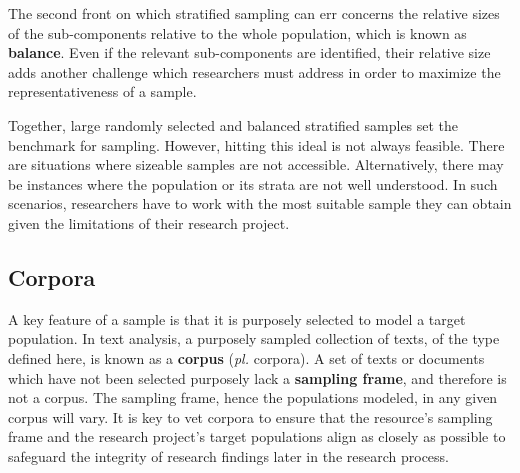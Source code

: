 \documentclass[
  letterpaper,
  DIV=11,
  numbers=noendperiod]{scrreport}
\theoremstyle{definition}
\theoremstyle{remark}
\begin{document}
The second front on which stratified sampling can err concerns the
relative sizes of the sub-components relative to the whole population,
which is known as \textbf{balance}. Even if the relevant sub-components
are identified, their relative size adds another challenge which
researchers must address in order to maximize the representativeness of
a sample.

Together, large randomly selected and balanced stratified samples set
the benchmark for sampling. However, hitting this ideal is not always
feasible. There are situations where sizeable samples are not
accessible. Alternatively, there may be instances where the population
or its strata are not well understood. In such scenarios, researchers
have to work with the most suitable sample they can obtain given the
limitations of their research project.

\hypertarget{corpora}{%
\subsection{Corpora}\label{corpora}}

A key feature of a sample is that it is purposely selected to model a
target population. In text analysis, a purposely sampled collection of
texts, of the type defined here, is known as a \textbf{corpus}
(\emph{pl.} corpora). A set of texts or documents which have not been
selected purposely lack a \textbf{sampling frame}, and therefore is not
a corpus. The sampling frame, hence the populations modeled, in any
given corpus will vary. It is key to vet corpora to ensure that the
resource's sampling frame and the research project's target populations
align as closely as possible to safeguard the integrity of research
findings later in the research process.
\end{document}
